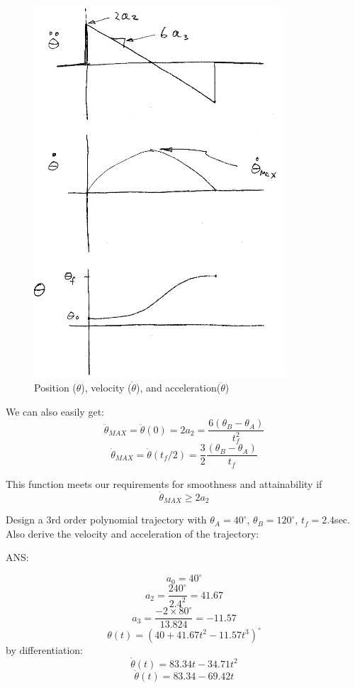 \begin{figure}\centering
\includegraphics[width=9.5cm]{figs07/00511.eps}
\caption{Position ($\theta$), velocity ($\dot{\theta}$), and acceleration($\ddot{\theta}$)}\label{pvathirdorder}
\end{figure}


We can also easily get:
\[
\ddot{\theta}_{MAX} = \ddot{\theta}(0) = 2a_2 = \frac{6(\theta_B-\theta_A)}{t_f^2}
\]
\[
\dot{\theta}_{MAX} = \dot{\theta}(t_f/2) = \frac{3}{2}\frac{(\theta_B-\theta_A)}{t_f}
\]

This function meets our requirements for smoothness and attainability if
\[
\ddot{\theta}_{MAX} \geq 2a_2
\]








\begin{ExampleSmall}
Design a 3rd order polynomial trajectory with $\theta_A = 40^\circ$, $\theta_B=120^\circ$, $t_f = 2.4$sec.   Also derive  the velocity and acceleration of the trajectory:

ANS:

\[
a_0 = 40^\circ
\]
\[
a_2 = \frac{240^\circ}{2.4^2} = 41.67
\]
\[
a_3 = \frac{-2\times80^\circ}{13.824} = -11.57
\]
\[
\theta(t) = (40 + 41.67t^2 - 11.57 t^3)^\circ
\]
by differentiation:
\[
\dot{\theta}(t) = 83.34t - 34.71t^2
\]
\[
\ddot{\theta}(t) = 83.34 - 69.42t
\]
\end{ExampleSmall}







